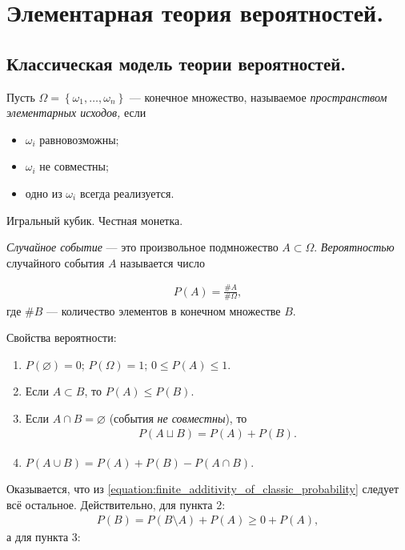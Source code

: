 \section{Элементарная теория вероятностей.}
\subsection{Классическая модель теории вероятностей.}

\begin{df*}
 Пусть $\Omega = \left\{ \omega_1, \ldots, \omega_n \right\}$ --- конечное множество, называемое \textit{пространством элементарных исходов,} если
 \begin{itemize}
  \item $\omega_i$ равновозможны;
  \item $\omega_i$ не совместны;
  \item одно из $\omega_i$ всегда реализуется.
 \end{itemize}
\end{df*}
\begin{exmpl*}
 Игральный кубик. Честная монетка.
\end{exmpl*}

\begin{df}
 \textit{Случайное событие}  --- это произвольное подмножество $A \subset \Omega$. \textit{Вероятностью} случайного события $A$ называется число

 \begin{align*}
  P(A) = \frac{\# A}{\# \Omega}
 ,\end{align*} где $\# B$ --- количество элементов в конечном множестве $B$.
\end{df}

\begin{prop*}
 Свойства вероятности:
 \begin{enumerate}
  \item $P(\varnothing) = 0$; $P(\Omega) = 1$; $0 \leqslant P(A) \leqslant 1$.
  \item Если $A \subset B$, то $P(A) \leqslant P(B)$.
  \item Если $A \cap B = \varnothing$ (события \textit{не совместны}), то
   \begin{align}
    \label{equation:finite_additivity_of_classic_probability}
    P(A \sqcup B) = P(A) + P(B)
   .\end{align} 
  \item $P(A \cup B) = P(A) + P(B) - P(A \cap B)$.
 \end{enumerate}
\end{prop*}
Оказывается, что из \eqref{equation:finite_additivity_of_classic_probability} следует всё остальное. Действительно, для пункта 2:
\begin{align*}
 P(B) = P(B \setminus A) + P(A) \geqslant 0 + P(A),
\end{align*}  а для пункта 3:

